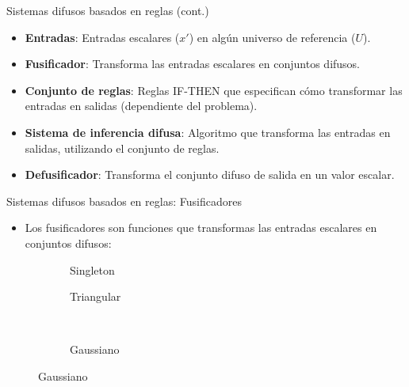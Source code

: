\documentclass{beamer}
\begin{document}
\begin{frame}{Sistemas difusos basados en reglas (cont.)}
\begin{itemize}
\item \textbf{Entradas}: Entradas escalares ($x'$) en algún universo de referencia ($U$).
\item \textbf{Fusificador}: Transforma las entradas escalares en conjuntos difusos.
\item \textbf{Conjunto de reglas}: Reglas IF-THEN que especifican cómo transformar las entradas en salidas (dependiente del problema).
\item \textbf{Sistema de inferencia difusa}: Algoritmo que transforma las entradas en salidas, utilizando el conjunto de reglas.
\item \textbf{Defusificador}: Transforma el conjunto difuso de salida en un valor escalar.
\end{itemize}
\scriptsize

\end{frame}

\begin{frame}{Sistemas difusos basados en reglas: Fusificadores}
\begin{itemize}
\item Los fusificadores son funciones que transformas las entradas escalares en conjuntos difusos:
\end{itemize}
	\begin{figure}
	\begin{subfigure}{0.45\textwidth}
		\caption{Singleton}
		\setlength\figureheight{2cm}
		\setlength\figurewidth{4cm}
		
	\end{subfigure}
	\qquad
	\begin{subfigure}{0.45\textwidth}
		\caption{Triangular}
		\setlength\figureheight{2cm}
		\setlength\figurewidth{4cm}
		
	\end{subfigure}
	\\
	\begin{subfigure}{0.45\textwidth}
		\caption{Gaussiano}
		\setlength\figureheight{2cm}
		\setlength\figurewidth{4cm}
		
	\end{subfigure}
	\end{figure}
\end{frame}
\end{document}
